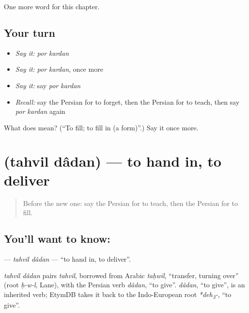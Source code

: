 \begin{grammarlens}[title={What you've built}]
One more word for this chapter.
\end{grammarlens}

\subsection*{Your turn}
\begin{itemize}
\raggedright
  \item \emph{Say it:} \emph{por kardan}
  \item \emph{Say it:} \emph{por kardan}, once more
  \item \emph{Say it:} say \emph{por kardan}
  \item \emph{Recall:} say the Persian for to forget, then the Persian for to teach, then say \emph{por kardan} again
\end{itemize}

\begin{tcolorbox}[breakable,colback=teal!4,colframe=teal!35!black,title={Before you move on}]
What does   mean? (\textquotedblleft{}To fill; to fill in (a form)\textquotedblright{}.) Say it once more.
\end{tcolorbox}
\section[\texorpdfstring{\fa{تحویل} \fa{دادن} (tahvil dâdan)}{تحویل دادن (tahvil dâdan)}]{  (tahvil dâdan) — to hand in, to deliver}

\label{lesson:FA-C143-tahvil-dadan}



\begin{quote}
Before the new one: say the Persian for to teach, then the Persian for to fill.
\end{quote}

\subsection*{You'll want to know:  }
\textbf{ } — \emph{tahvil dâdan} — \textquotedblleft{}to hand in, to deliver\textquotedblright{}.

\begin{cousinweb}
\emph{tahvil dâdan} pairs \emph{tahvil}, borrowed from Arabic \emph{taḥwīl}, \textquotedblleft{}transfer, turning over\textquotedblright{} (root \emph{ḥ-w-l}, Lane), with the Persian verb \emph{dâdan}, \textquotedblleft{}to give\textquotedblright{}. \emph{dâdan}, \textquotedblleft{}to give\textquotedblright{}, is an inherited verb; EtymDB takes it back to the Indo-European root \emph{*deh\textsubscript{3}-}, \textquotedblleft{}to give\textquotedblright{}.
\end{cousinweb}

